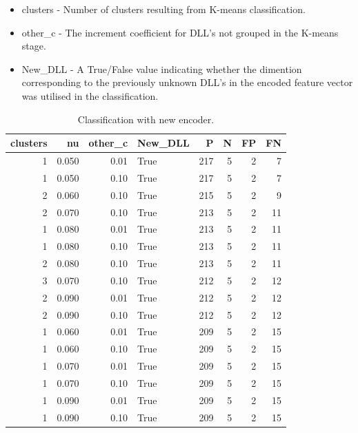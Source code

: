 \documentclass[a4paper,twoside,12pt]{book}
\begin{document}
\begin{itemize}
	\item clusters - Number of clusters resulting from K-means classification.
	\item other\_c - The increment coefficient for DLL's not grouped in the K-means stage. %
	\item New\_DLL - A True/False value indicating whether the dimention corresponding 
	to the previously unknown DLL's in the encoded feature vector was utilised in the classification.
\end{itemize}

\begin{table}
	\centering
	\caption{Classification with new encoder.}
	\label{id:tab:resEncoder}
	\begin{tabular}{rrrlrrrr}
		\toprule
		 clusters &     nu &  other\_c &  New\_DLL &    P &  N &  FP &  FN \\
		\midrule
				1 &  0.050 &     0.01 &     True &  217 &  5 &   2 &   7 \\
				1 &  0.050 &     0.10 &     True &  217 &  5 &   2 &   7 \\
				2 &  0.060 &     0.10 &     True &  215 &  5 &   2 &   9 \\
				2 &  0.070 &     0.10 &     True &  213 &  5 &   2 &  11 \\
				1 &  0.080 &     0.01 &     True &  213 &  5 &   2 &  11 \\
				1 &  0.080 &     0.10 &     True &  213 &  5 &   2 &  11 \\
				2 &  0.080 &     0.10 &     True &  213 &  5 &   2 &  11 \\
				3 &  0.070 &     0.10 &     True &  212 &  5 &   2 &  12 \\
				2 &  0.090 &     0.01 &     True &  212 &  5 &   2 &  12 \\
				2 &  0.090 &     0.10 &     True &  212 &  5 &   2 &  12 \\
				1 &  0.060 &     0.01 &     True &  209 &  5 &   2 &  15 \\
				1 &  0.060 &     0.10 &     True &  209 &  5 &   2 &  15 \\
				1 &  0.070 &     0.01 &     True &  209 &  5 &   2 &  15 \\
				1 &  0.070 &     0.10 &     True &  209 &  5 &   2 &  15 \\
				1 &  0.090 &     0.01 &     True &  209 &  5 &   2 &  15 \\
				1 &  0.090 &     0.10 &     True &  209 &  5 &   2 &  15 \\

\end{tabular}
\end{table}
\end{document}
